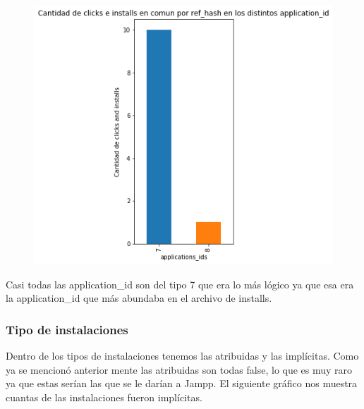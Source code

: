 \documentclass[a4paper, 12pt]{article}
\newcommand\tab[1][1cm]{\hspace*{#1}}
\begin{document}
{{	 \FloatBarrier
		\begin{figure}[h]
			\centering
			\includegraphics[scale = 0.5]{images/clicks-installs/application_id.png}
			\caption{}
		\end{figure}
	\FloatBarrier
	
	\tab Casi todas las application\_id son del tipo 7 que era lo más lógico ya que esa era la application\_id que más abundaba en el archivo de installs.
	
	\subsubsection{Tipo de instalaciones}
	\tab Dentro de los tipos de instalaciones tenemos las atribuidas y las implícitas. Como ya se mencionó anterior mente las atribuidas son todas false, lo que es muy raro ya que estas serían las que se le darían a Jampp. 
	\newline
	\newline
	\tab El siguiente gráfico nos muestra cuantas de las instalaciones fueron implícitas.
	
}}
\end{document}
